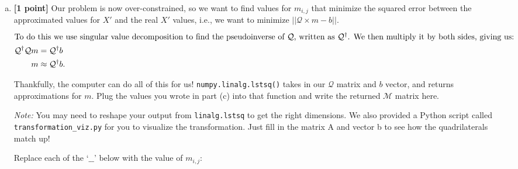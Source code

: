 \begin{enumerate}[(a)]
\item \textbf{[1 point]} Our problem is now over-constrained, so we want to find values for $m_{i,j}$ that minimize the squared error between the approximated values for $X'$ and the real $X'$ values, i.e., we want to minimize $||\mathcal{Q} \times m - b||$. 
\begin{align*}
\intertext{To do this we use singular value decomposition to find the pseudoinverse of $\mathcal{Q}$, written as $\mathcal{Q}^\dagger$. We then multiply it by both sides, giving us:}
 \mathcal{Q}^\dagger \mathcal{Q}m &= \mathcal{Q}^\dagger b\\
 \quad m &\approx \mathcal{Q}^\dagger b.
\end{align*}

Thankfully, the computer can do all of this for us! \texttt{numpy.linalg.lstsq()} takes in our $\mathcal{Q}$ matrix and $b$ vector, and returns approximations for $m$. Plug the values you wrote in part (c) into that function and write the returned $\mathcal{M}$ matrix here.

\textit{Note:} You may need to reshape your output from \texttt{linalg.lstsq} to get the right dimensions. We also provided a Python script called \texttt{transformation\_viz.py} for you to visualize the transformation. Just fill in the matrix A and vector b to see how the quadrilaterals match up!

\begin{tcolorbox}[colback=orange!5!white,colframe=orange!75!black]
Replace each of the `$\_\_$' below with the value of $m_{i, j}$:
\end{tcolorbox}



\end{enumerate}
